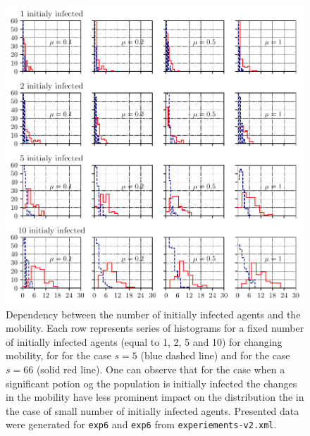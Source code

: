 \documentclass[11pt,a4paper]{article}
\begin{document}
\begin{figure}[ht!]
\includegraphics{plots/plot_pop100_world-1_exp6_exp7_hist.pdf}
\caption{Dependency between the number of initially infected agents and the mobility. Each row represents series of histograms for a fixed number of initially infected agents (equal to 1, 2, 5 and 10) for changing mobility, for for the case $s=5$ (blue dashed line) and for the case $s=66$ (solid red line). One can observe that for the case when a significant potion og the population is initially infected the changes in the mobility have less prominent impact on the distribution the in the case of small number of initially infected agents. Presented data were generated for \texttt{exp6} and \texttt{exp6} from  \texttt{experiements-v2.xml}.}
\label{fig:exp6_pop100_world-1_hist}
\end{figure}
\end{document}

